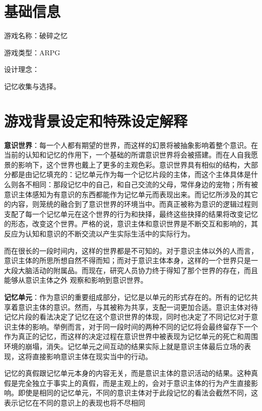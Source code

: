 \documentclass[12pt, a4paper]{article}
\begin{document}
    \section*{基础信息}
    游戏名称：破碎之忆

    游戏类型：ARPG

    设计理念：
    
        \quad 记忆收集与选择。
    \newpage 

    \section*{游戏背景设定和特殊设定解释}
        
        \textbf{意识世界}：每一个人都有期望的世界，而这样的幻景将被抽象影响着整个意识。在当前的认知和记忆的作用下，一个基础的所谓意识世界将会被搭建。而在人自我愿景的影响下，这个世界也戴上了更多的主观色彩。意识世界具有相似的结构，大部分都是由记忆填充的：记忆单元作为每一个记忆片段的主体，而这个主体具体是什么则各不相同：那段记忆中的自己，和自己交流的父母，常伴身边的宠物；所有被意识主体感知为有意识的东西都能作为记忆单元而表现出来。而记忆所涉及的其它的内容，则笼统的融合到了意识世界的环境当中。而真正被称为意识的逻辑过程则支配了每一个记忆单元在这个世界的行为和抉择，最终这些抉择的结果将改变记忆的形态，改变这个世界。严格的说，意识主体和意识世界是不断交互和影响的，其反应为认知和意识的不断交流以产生实际生活中的实际行为。 
        
       而在很长的一段时间内，这样的世界都是不可知的。对于意识主体以外的人而言，意识主体的所思所想自然不得而知；而对于意识主体本身，这样的一个世界只是一大段大脑活动的附属品。而现在，研究人员协力终于得知了那个世界的存在，而且能够从意识主体之外
        观察和影响到意识世界。 

        \medskip
        \textbf{记忆单元}：作为意识的重要组成部分，记忆是以单元的形式存在的。所有的记忆共享着意识主体的意识。然而，与其被称为共享，支配一词更加合适。意识主体对待记忆片段的看法决定了记忆在这个意识世界的体现，同时也决定了不同记忆对于意识主体的影响。举例而言，对于同一段时间的两种不同的记忆将会最终留存下一个作为真正的记忆，而这样的决定过程在意识世界中被表现为记忆单元的死亡和周围环境的崩塌，消失。记忆单元之间互动的结果实际上就是意识主体最后立场的表现，这将直接影响意识主体在现实当中的行动。 

        记忆的真假跟记忆单元本身的内容无关，而是意识主体的意识活动的结果。这种真假是完全独立于事实上的真假，而是主观上的，会对于意识主体的行为产生直接影响。即使是相同的记忆单元，不同的意识主体对于此段记忆的看法会截然不同，这表示记忆在不同的意识上的表现也将不尽相同
\end{document}
